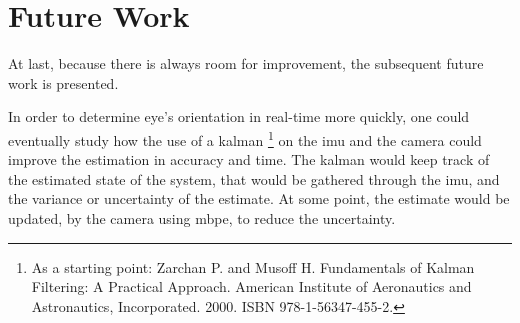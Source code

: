 \section{Future Work}

At last, because there is always room for improvement, the subsequent future work is presented.

In order to determine eye's orientation in real-time more quickly, one could eventually study how the use of a \gls{kalman} \footnote{As a starting point: Zarchan P. and Musoff H. Fundamentals of Kalman Filtering: A Practical Approach. American Institute of Aeronautics and Astronautics, Incorporated. 2000. ISBN 978-1-56347-455-2.} on the \acrshort{imu} and the camera could improve the estimation in accuracy and time. The \gls{kalman} would keep track of the estimated state of the system, that would be gathered through the \acrshort{imu}, and the variance or uncertainty of the estimate. At some point, the estimate would be updated, by the camera using \acrshort{mbpe}, to reduce the uncertainty.